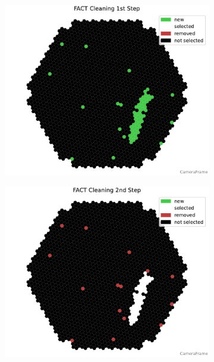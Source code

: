 \begin{figure}
    \centering
    \begin{subfigure}[t]{0.32\textwidth}
        \includegraphics[width=\textwidth]{plots/cleaner_steps/fact_1.pdf}
    \end{subfigure}
    \hfill
    \begin{subfigure}[t]{0.32\textwidth}
        \includegraphics[width=\textwidth]{plots/cleaner_steps/fact_2.pdf}
    \end{subfigure}
    \hfill
    \begin{subfigure}[t]{0.32\textwidth}

\end{subfigure}
\end{figure}
